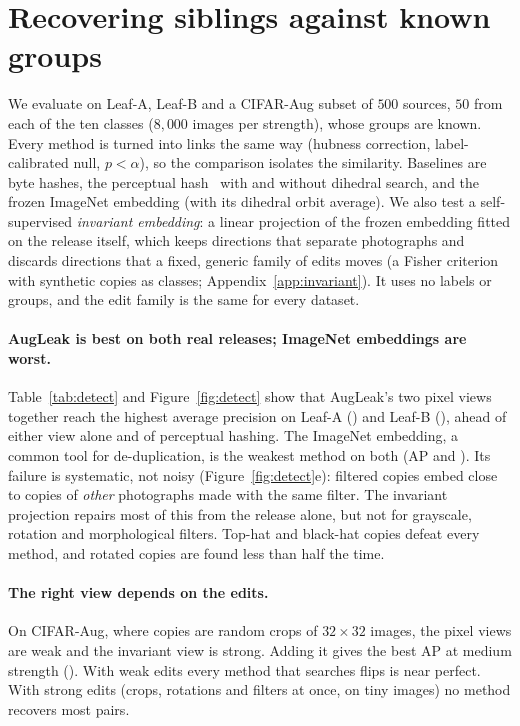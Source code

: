 \section{Recovering siblings against known groups}
\label{sec:detect}

We evaluate on Leaf-A, Leaf-B and a CIFAR-Aug subset of $500$ sources, $50$ from each of the ten classes ($8{,}000$ images per strength), whose groups are known. Every method is turned into links the same way (hubness correction, label-calibrated null, $p<\alpha$), so the comparison isolates the similarity. Baselines are byte hashes, the perceptual hash~\citep{zauner2010phash} with and without dihedral search, and the frozen ImageNet embedding (with its dihedral orbit average). We also test a self-supervised \emph{invariant embedding}: a linear projection of the frozen embedding fitted on the release itself, which keeps directions that separate photographs and discards directions that a fixed, generic family of edits moves (a Fisher criterion with synthetic copies as classes; Appendix~\ref{app:invariant}). It uses no labels or groups, and the edit family is the same for every dataset.



\paragraph{AugLeak is best on both real releases; ImageNet embeddings are worst.}
Table~\ref{tab:detect} and Figure~\ref{fig:detect} show that AugLeak's two pixel views together reach the highest average precision on Leaf-A (\numDetLeafApixAP{}) and Leaf-B (\numDetLeafBpixAP{}), ahead of either view alone and of perceptual hashing. The ImageNet embedding, a common tool for de-duplication, is the weakest method on both (AP \numDetLeafAsemAP{} and \numDetLeafBsemAP{}). Its failure is systematic, not noisy (Figure~\ref{fig:detect}e): filtered copies embed close to copies of \emph{other} photographs made with the same filter. The invariant projection repairs most of this from the release alone, but not for grayscale, rotation and morphological filters. Top-hat and black-hat copies defeat every method, and rotated copies are found less than half the time.

\paragraph{The right view depends on the edits.}
On CIFAR-Aug, where copies are random crops of $32\times32$ images, the pixel views are weak and the invariant view is strong. Adding it gives the best AP at medium strength (\numDetCmediumallAP{}). With weak edits every method that searches flips is near perfect. With strong edits (crops, rotations and filters at once, on tiny images) no method recovers most pairs.

